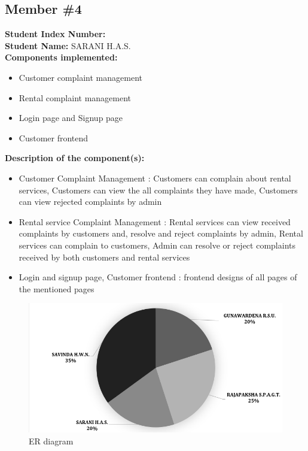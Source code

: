 \subsection{Member \#4}
\textbf{Student Index Number: } \\
\textbf{Student Name: } SARANI H.A.S. \\
\textbf{Components implemented:} 
\begin{itemize}
    \item Customer complaint management
    \item Rental complaint management
    \item Login page and Signup page
    \item Customer frontend
\end{itemize}
\textbf{Description of the component(s):}
\begin{itemize}
    \item Customer Complaint Management : Customers can complain about rental services, Customers can view the all complaints they have made, Customers can view rejected complaints by admin
    \item Rental service Complaint Management : Rental services can view received complaints by customers and, resolve and reject complaints by admin, Rental services can complain to customers, Admin can resolve or reject complaints received by both customers and rental services
    \item Login and signup page, Customer frontend : frontend designs of all pages of the mentioned pages
\end{itemize}

\begin{figure}[h!]
    \centering
    \includegraphics[width=1\textwidth]{Images/pie.png}
    \caption{ER diagram}
    \label{fig:enter-label}
\end{figure}
\clearpage




